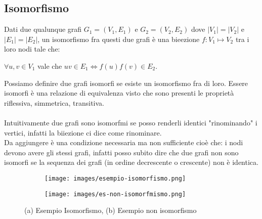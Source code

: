\subsection{Isomorfismo}
\begin{definition}[Isomorfismo]
    Dati due qualunque grafi $G_1 = (V_1, E_1)$ e $G_2 = (V_2, E_2)$ dove $|V_1| = |V_2|$ e $|E_1| = |E_2|$, un isomorfismo fra questi due  grafi è una bieezione $f: V_1 \mapsto V_2$ tra i loro nodi tale che:
    \begin{center}
        \vspace{-5pt}
        $\forall u,v \in V_1$ vale che $uv \in E_1 \Longleftrightarrow f(u)f(v) \in E_2$.
    \end{center}
\end{definition}
\hspace{-15pt}Possiamo definire due grafi isomorfi se esiste un isomorfismo fra di loro. Essere isomorfi è una relazione di equivalenza visto che sono presenti le proprietà riflessiva, simmetrica, transitiva.\\\\
Intuitivamente due grafi sono isomorfmi se posso renderli identici "rinominando" i vertici, infatti la biiezione ci dice come rinominare.\\
Da aggiungere è una condizione necessaria ma non sufficiente cioè che: i nodi devono avere gli stessi grafi, infatti posso subito dire che due grafi non sono isomorfi se la sequenza dei grafi (in ordine decrescente o crescente) non è identica.
\begin{figure}[h!]
    \vspace{-5pt}
    \centering
    \begin{subfigure}{.3\textwidth}
        \centering
        \texttt{[image: images/esempio-isomorfismo.png]}
        \vspace{-8pt}
        \caption{}
    \end{subfigure}
    \hspace{3cm}
    \begin{subfigure}{.3\textwidth}
        \centering
        \texttt{[image: images/es-non-isomorfmismo.png]}
        \vspace{-5pt}
        \caption{}
    \end{subfigure}
    \vspace{-5pt}
    \caption{(a) Esempio Isomorfismo, (b) Esempio non isomorfismo}
\end{figure}


